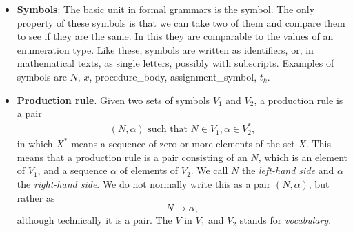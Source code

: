 \documentclass{report}
\begin{document}
\begin{itemize}
\begin{itemize}
                \item \textbf{Ambiguous grammar}: A grammar is ambiguous if it can produce two different production trees with the same leaves in the same order. 
                    \bigbreak \noindent 
                    That means that when we lose the production tree due to linearization of the program text we cannot reconstruct it unambiguously; and since the semantics derives from the production tree, we lose the semantics as well. So ambiguous grammars are to be avoided in the specification of programming languages, where attached semantics plays an important role
            \end{itemize}
        \item \textbf{Symbols}: The basic unit in formal grammars is the symbol. The only property of these symbols is that we can take two of them and compare them to see if they are the same. In this they are comparable to the values of an enumeration type. Like these, symbols are written as identifiers, or, in mathematical texts, as single letters, possibly with subscripts. Examples of symbols are $N$, $x $, procedure\_body, assignment\_symbol, $t_{k} $.
        \item \textbf{Production rule}. Given two sets of symbols $V_{1}$ and $V_{2}$, a production rule is a pair
            \begin{align*}
                (N, \alpha) \text{ such that } N \in V_{1}, \alpha \in V_{2}^{*}
            ,\end{align*}
            in which $X^{*} $ means a sequence of zero or more elements of the set $X$. This means that a production rule is a pair consisting of an $N$, which is an element of $V_1$, and a sequence $\alpha$ of elements of $V_2$. We call $N$ the \emph{left-hand side} and $\alpha$ the \emph{right-hand side}. We do not normally write this as a pair $(N, \alpha)$, but rather as
            \[
                N \to \alpha,
            \]
            although technically it is a pair. The $V$ in $V_1$ and $V_2$ stands for \emph{vocabulary}.


\end{itemize}
\end{document}
